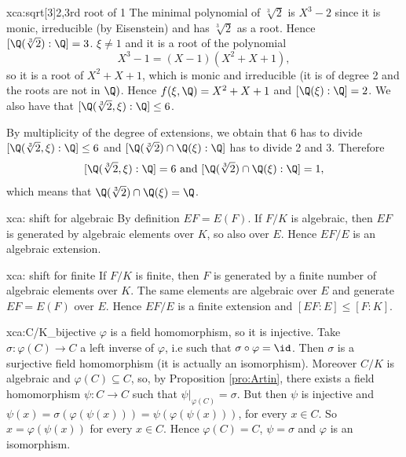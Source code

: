 \begin{sol}{xca:sqrt[3]2,3rd root of 1}
The minimal polynomial of $\sqrt[3]{2}$ is $X^3-2$
since it is monic, irreducible (by Eisenstein) and has $\sqrt[3]{2}$
as a root. Hence $[\Q(\sqrt[3]{2}):\Q]=3$.
$\xi\neq 1$ and it is a root of the polynomial 
\[
X^3-1=(X-1)(X^2+X+1),
\]
so it is a root of $X^2+X+1$, which is monic and
irreducible (it is of degree 2 and the roots are not in $\Q)$.
Hence $f(\xi,\Q)=X^2+X+1$ and $[\Q(\xi):\Q]=2$.
We also have that $[\Q(\sqrt[3]{2},\xi):\Q]\leq 6$.
    \begin{center}
    \end{center}
By multiplicity of the degree of extensions, we obtain that
6 has to divide $[\Q(\sqrt[3]{2},\xi):\Q]\leq 6$ and
$[\Q(\sqrt[3]{2})\cap\Q(\xi):\Q]$ has to divide 2 and 3.
Therefore 
\[
[\Q(\sqrt[3]{2},\xi):\Q]=6 \text{ and }
[\Q(\sqrt[3]{2})\cap\Q(\xi):\Q]=1,
\]
which means that
$\Q(\sqrt[3]{2})\cap\Q(\xi)=\Q$.
\end{sol}

\begin{sol}{xca: shift for algebraic}
By definition $EF=E(F)$. If $F/K$ is algebraic, then $EF$ is
generated by algebraic elements over $K$, so also over $E$.
Hence $EF/E$ is an algebraic extension.
\end{sol}

\begin{sol}{xca: shift for finite}
If $F/K$ is finite,
then $F$ is generated by a finite number of algebraic elements over $K$.
The same elements are algebraic over $E$ and generate $EF=E(F)$ over $E$.
Hence $EF/E$ is a finite extension and $[EF:E]\leq [F:K]$.
\end{sol}

\begin{sol}{xca:C/K_bijective}
$\varphi$ is a field homomorphism,
so it is injective.
Take $\sigma:\varphi(C)\to C$ a left inverse
of $\varphi$, i.e such that $\sigma\circ\varphi=\id$.
Then $\sigma$ is a surjective field homomorphism (it is actually an isomorphism).
Moreover $C/K$ is algebraic and $\varphi(C)\subseteq C$,
so, by Proposition \ref{pro:Artin}, there exists 
a field homomorphism $\psi: C\to C$
such that $\psi|_{\varphi(C)}=\sigma$.
But then $\psi$ is injective and 
$\psi(x)=\sigma(\varphi(\psi(x)))=\psi(\varphi(\psi(x)))$, for every $x\in C$.
So $x=\varphi(\psi(x))$ for every $x\in C$.
Hence $\varphi(C)=C$, $\psi=\sigma$ and $\varphi$ is an isomorphism.
\end{sol}

